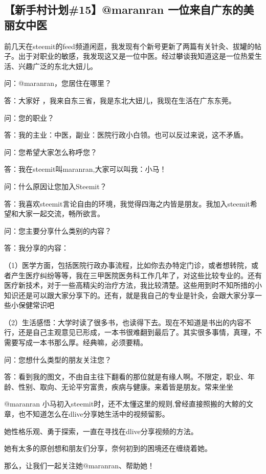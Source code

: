 \documentclass[]{ctexbook}
\begin{document}
\hypertarget{15maranran-}{%
\subsection{【新手村计划\#15】@maranran 一位来自广东的美丽女中医}\label{15maranran-}}

前几天在steemit的feed频道闲逛，我发现有个新号更新了两篇有关针灸、拔罐的帖子。出于对职业的敏感，我发现这又是一位中医。经过攀谈我知道这是一位热爱生活、兴趣广泛的东北大妞儿。

问：@maranran，您居住在哪里？

答：大家好 ，我来自东三省，我是东北大妞儿，我现在生活在广东东莞。

问：您的职业？

答：我的主业：中医，副业：医院行政小白领。也可以反过来说，这不矛盾。

问：您希望大家怎么称呼您？

答：我在steemit叫maranran,大家可以叫我：小马！

问：什么原因让您加入Steemit？

答：我喜欢steemit言论自由的环境，我觉得四海之内皆是朋友。我加入steemit希望和大家一起交流，畅所欲言。

问：您主要分享什么类别的内容？

答：我分享的内容：

（1）医学方面，包括医院行政办事流程，比如你去办特定门诊，或者想转院，或者产生医疗纠纷等等，我在三甲医院医务科工作几年了，对这些比较专业的。还有医疗新技术，对于一些高精尖的治疗方法，我比较清楚。这些用到时不知所措的小知识还是可以跟大家分享下的。还有，就是我自己的专业是针灸，会跟大家分享一些小保健常识吧

（2）生活感悟：大学时读了很多书，也读得下去。现在不知道是书出的内容不行，还是自己主观意见已形成，一本书很难翻到最后了。其实很多事情，真理，不需要写成一本书那么厚。经典嘛，必须要精。

问：您想什么类型的朋友关注您？

答：看到我的图文，不由自主往下翻看的那位就是有缘人啊。不限定，职业、年龄、性别、取向、无论平穷富贵，疾病与健康。来着皆是朋友。常来坐坐

@maranran 小马初入steemit时，还不太懂这里的规则,曾经直接照搬的大鲸的文章，也不知道怎么在dlive分享她生活中的视频留影。

她性格乐观、勇于探索，一直在寻找在dlive分享视频的方法。

她有太多的原创想和朋友们分享，奈何初到的困境还在缠绕着她。

那么，让我们一起关注她@maranran、帮助她！
\end{document}

